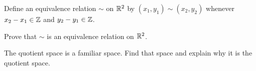\begin{comment}

\ExerciseSolution A subset $U$ of $\{a,b,c\}$ is in the quotient topology if and only if $p^{-1}(U)$ is open in $X$. Now 
\begin{align*}
p^{-1}(\{a\}) &= (-\infty, 0) \\
p^{-1}(\{b\}) &= \{0\} \\
p^{-1}(\{c\}) &= (0, \infty) \\
p^{-1}(\{a,b\}) &= (-\infty, 0] \\
p^{-1}(\{a,c\}) &= (-\infty, 0) \cup (0, \infty) \\
p^{-1}(\{b,c\}) &= [0,\infty),
\end{align*}
so the quotient topology is $\{\emptyset, \{a\}, \{c\}, \{a,c\}, \{a,b,c\}\}$.  

\end{comment}

\item Define an equivalence relation $\sim$ on $\mathbb{R}^2$ by $(x_1,y_1) \sim (x_2,y_2)$ whenever $x_2 - x_1 \in \mathbb{Z}$ and $y_2 - y_1 \in \mathbb{Z}$. 

\ba

\item Prove that $\sim$ is an equivalence relation on $\mathbb{R}^2$.

\item The quotient space is a familiar space. Find that space and explain why it is the quotient space.

\ea

